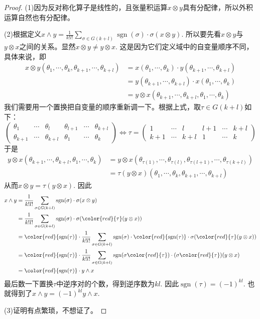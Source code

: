 \begin{proof}
(1)因为反对称化算子是线性的，且张量积运算$x\otimes y$具有分配律，所以外积运算自然也有分配律。

(2)根据定义$x\wedge y=\frac{1}{k!l!}\sum_{\sigma\in G(k+l)}\operatorname{sgn}(\sigma)\cdot \sigma(x\otimes y)$. 所以要先看$x\otimes y$与$y\otimes x$之间的关系。显然$x\otimes y\neq y\otimes x$. 这是因为它们定义域中的自变量顺序不同，具体来说，即
\[
\begin{split}
x\otimes y(\theta_{1},\cdots,\theta_{k},\theta_{k+1},\cdots,\theta_{k+l})&=x(\theta_{1},\cdots,\theta_{k})\cdot y(\theta_{k+1},\cdots,\theta_{k+l})\\
&=y(\theta_{k+1},\cdots,\theta_{k+l})\cdot x(\theta_{1},\cdots,\theta_{k})\\
&=y\otimes x(\theta_{k+1},\cdots,\theta_{k+l},\theta_{1},\cdots,\theta_{k})
\end{split}
\]
我们需要用一个置换把自变量的顺序重新调一下。根据上式，取$\tau\in G(k+l)$如下：
\[
	\left(\begin{array}{llllll}
		\theta_{1} & \cdots  & \theta_{l} & \theta_{l+1} & \cdots & \theta_{k+l} \\
		\theta_{k+1} & \cdots & \theta_{k+l} & \theta_{1} & \cdots  & \theta_{k} 
		\end{array}\right)\Leftrightarrow \tau=\left(\begin{array}{llllll}
			1 & \cdots  & l & l+1 & \cdots & k+l \\
			k+1 & \cdots & k+l & 1 & \cdots  & k 
			\end{array}\right)
\]
于是
\[
\begin{split}
y\otimes x(\theta_{k+1},\cdots,\theta_{k+l},\theta_{1},\cdots,\theta_{k})
&=y\otimes x(\theta_{\tau(1)},\cdots,\theta_{\tau(l)},\theta_{\tau(l+1)},\cdots,\theta_{\tau(k+l)})\\
&=\tau(y\otimes x)(\theta_{1},\cdots,\theta_{k},\theta_{k+1},\cdots,\theta_{k+l})
\end{split}
\]
从而$x\otimes y=\tau(y\otimes x)$. 因此
\[
\begin{split}
	x\wedge y&=\frac{1}{k!l!}\sum_{\sigma\in G(k+l)}\operatorname{sgn}(\sigma)\cdot \sigma(x\otimes y)\\
	&=\frac{1}{k!l!}\sum_{\sigma\in G(k+l)}\operatorname{sgn}(\sigma)\cdot \sigma({\color{red}{\tau}}(y\otimes x))\\
	&={\color{red}{\operatorname{sgn}(\tau)}}\cdot \frac{1}{k!l!}\sum_{\sigma\in G(k+l)}\operatorname{sgn}(\sigma)\cdot {\color{red}{\operatorname{sgn}(\tau)}}\cdot \sigma({\color{red}{\tau}}(y\otimes x))\\
	&={\color{red}{\operatorname{sgn}(\tau)}}\cdot \frac{1}{k!l!}\sum_{\sigma\in G(k+l)}\operatorname{sgn}(\sigma{\color{red}{\tau}})\cdot (\sigma{\color{red}{\tau}})(y\otimes x)\\
	&={\color{red}{\operatorname{sgn}(\tau)}}\cdot y\wedge x
\end{split}
\]
最后数一下置换$\tau$中逆序对的个数，得到逆序数为$kl$. 因此$\operatorname{sgn}(\tau)=(-1)^{kl}$. 也就得到了$x\wedge y=(-1)^{kl} y\wedge x$.

(3)证明有点繁琐，不想证了。
\end{proof}
